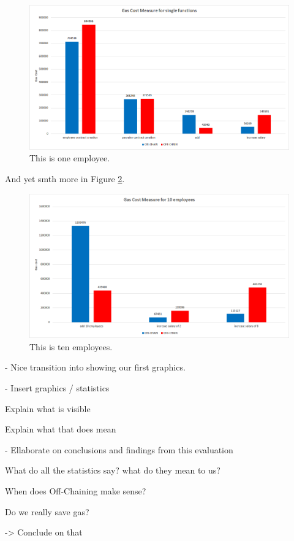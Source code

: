 \begin{figure}[!htb]
\centering
\includegraphics[width=1.0\textwidth]{images/05_gas_cost_single.png}
\caption{\label{fig:05_gas_cost_single}This is one employee.}
\end{figure}

And yet smth more in Figure \ref{fig:05_gas_cost_ten}.

\begin{figure}[!htb]
\centering
\includegraphics[width=1.0\textwidth]{images/05_gas_cost_ten.png}
\caption{\label{fig:05_gas_cost_ten}This is ten employees.}
\end{figure}


- Nice transition into showing our first graphics.

- Insert graphics / statistics

Explain what is visible

Explain what that does mean

- Ellaborate on conclusions and findings from this evaluation

What do all the statistics say? what do they mean to us?

When does Off-Chaining make sense?

Do we really save gas?

-> Conclude on that

